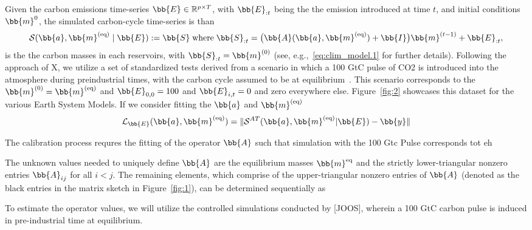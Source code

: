 Given the carbon emissions time-series $\bb{E} \in \mathbb{R}^{p \times T}$, with $\bb{E}_{:t}$ being the the emission introduced at time $t$, and initial conditions $\bb{m}^{0}$, the simulated carbon-cycle time-series is than 
%
\begin{align}
	\mathcal{S}(\bb{a},\bb{m}^{(\text{eq})} \; | \; \bb{E}):= \bb{S} \; \text{where}\;  \bb{S}_{:t} = \big(\bb{A}(\bb{a},\bb{m}^{(\text{eq})} )+\bb{I} \big) \bb{m}^{(t-1)} + \bb{E}_{:t} ,
\end{align}
%
is the the carbon masses in each reservoirs, with $\bb{S}_{:t}=\bb{m}^{(0)}$ (see, e.g.,~\eqref{eq:clim_model.1} for further details). 
Following the approach of X, we utilize a set of standardized tests derived from a scenario in which a 100 GtC pulse of CO2 is introduced into the atmosphere during preindustrial times, with the carbon cycle assumed to be at equilibrium~\cite{joos2013carbon}. 
This scenario corresponds to the $\bb{m}^{(0)}=\bb{m}^{(\text{eq})}$ and $\bb{E}_{0,0}=100$ and $\bb{E}_{i,t}=0$ and zero everywhere else.  
Figure~\ref{fig:2} showcases this dataset for the various Earth System Models.
If we consider fitting the $\bb{a}$ and $\bb{m}^{(\text{eq})}$
\begin{align}
	\mathcal{L}_{\bb{E}} (\bb{a},\bb{m}^{(\text{eq})}) = \| \mathcal{S}^{AT}(\bb{a},\bb{m}^{(\text{eq})} | \bb{E}) - \bb{y} \|
\end{align}



The calibration process requres the fitting of the operator $\bb{A}$ such that simulation with the 100 Gtc Pulse corresponds tot eh  












\newpage

The unknown values needed to uniquely define $\bb{A}$ are the equilibrium masses $\bb{m}^{\text{eq}}$ and the strictly lower-triangular nonzero entries $\bb{A}_{ij}$ for all $i<j$. The remaining elements, which comprise of the upper-triangular nonzero entries of $\bb{A}$ (denoted as the black entries in the matrix sketch in Figure~\ref{fig:1}), can be determined sequentially as
%

%
 
 



To estimate the operator values, we will utilize the controlled simulations conducted by [JOOS], wherein a 100 GtC carbon pulse is induced in pre-industrial time at equilibrium. 

